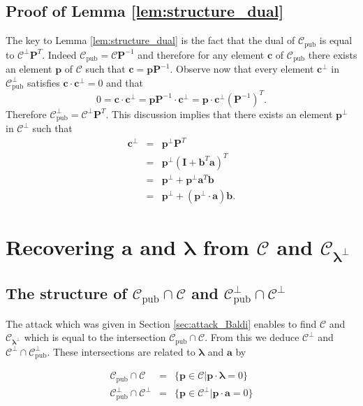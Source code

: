 \documentclass[runningheads,11pt]{llncs}
\newcommand{\code}[1]{\ensuremath{\mathscr{#1}}}
\newcommand{\Cpub}{\code{C}_{\text{pub}}}
\newcommand{\CC}{\code{C}}
\newcommand{\scp}[2]{#1\cdot #2}
\newcommand{\word}[1]{\ensuremath{\boldsymbol{#1}}}
\newcommand{\av}{\word{a}}
\newcommand{\bv}{\word{b}}
\newcommand{\lambdav}{\word{\lambda}}
\newcommand{\cv}{\word{c}}
\newcommand{\pv}{\word{p}}
\newcommand{\mat}[1]{\ensuremath{\boldsymbol{#1}}}
\renewcommand{\Im}{\mat{I}}
\newcommand{\Pm}{\mat{P}}
\begin{document}
\subsection{Proof of Lemma \ref{lem:structure_dual}}

The key to Lemma \ref{lem:structure_dual} is the fact that the
dual of $\Cpub$ is equal to 
$\CC^\perp \Pm^T$. Indeed $\Cpub = \CC\Pm^{-1}$ and therefore for any element $\cv$
of $\Cpub$ there exists an  element $\pv$ of $\CC$ such that 
$\cv = \pv \Pm^{-1}$. Observe now that every element $\cv^\perp$ in $\Cpub^\perp$ satisfies
$\scp{\cv}{\cv^\perp}=0$ and that
$$0=\scp{\cv}{\cv^\perp} = \scp{\pv \Pm^{-1}}{\cv^\perp} = \scp{\pv}{\cv^\perp \left( \Pm^{-1}\right)^T}.$$
Therefore $\Cpub^\perp =\CC^\perp\Pm^T$. This discussion implies that
there exists an element $\pv^\perp$ in $\CC^\perp$ such that
\begin{eqnarray*}
\cv^\perp & = & \pv^\perp \Pm^T\\
& = & \pv^\perp  \left(\Im +  \bv^T \av \right)^T\\
& = & \pv^\perp  + \pv^\perp \av^T \bv \\
& = & \pv^\perp + (\scp{\pv^\perp }{\av}) \bv.
\end{eqnarray*} 
 

\newpage
\section{Recovering $\av$ and $\lambdav$ from $\CC$ and $\CC_{\lambdav^\perp}$}
\label{sec:appendix_C}





\subsection{The structure of $\Cpub \cap \CC$ and $\Cpub^\perp \cap \CC^\perp$}

The attack which was given in Section \ref{sec:attack_Baldi} enables to find $\CC$ and $\CC_{\lambdav^\perp}$ 
which is equal to the intersection $\Cpub \cap \CC$. From this we deduce 
$\CC^\perp$ and $\CC^\perp \cap \Cpub^\perp$. These intersections are related to
$\lambdav$ and $\av$ by

\begin{lemma}
\label{lem:intersection}
\begin{eqnarray}
\Cpub \cap \CC & = & \{\pv \in \CC | \scp{\pv}{\lambdav}=0\} \label{eq:intersection_CC}\\
\Cpub^\perp \cap \CC^\perp & = & \{\pv \in \CC^\perp | \scp{\pv}{\av}=0\} \label{eq:intersection_CCperp}
\end{eqnarray}
\end{lemma}
\end{document}
